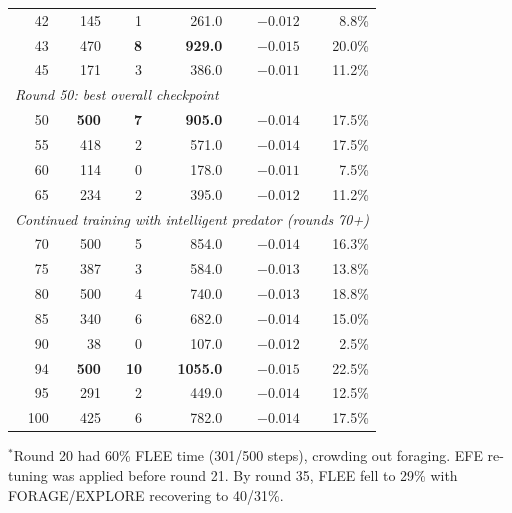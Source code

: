 \documentclass[12pt]{article}
\begin{document}
\begin{table}[H]
\begin{tabular}{rrrrrr}
42 & 145 & 1 & 261.0  & $-0.012$ & 8.8\% \\
43 & 470 & \textbf{8} & \textbf{929.0} & $-0.015$ & 20.0\% \\
45 & 171 & 3 & 386.0  & $-0.011$ & 11.2\% \\
\midrule
\multicolumn{6}{l}{\textit{Round 50: best overall checkpoint}} \\
\midrule
50 & \textbf{500} & \textbf{7} & \textbf{905.0} & $-0.014$ & 17.5\% \\
55 & 418 & 2 & 571.0  & $-0.014$ & 17.5\% \\
60 & 114 & 0 & 178.0  & $-0.011$ & 7.5\% \\
65 & 234 & 2 & 395.0  & $-0.012$ & 11.2\% \\
\midrule
\multicolumn{6}{l}{\textit{Continued training with intelligent predator (rounds 70+)}} \\
\midrule
70 & 500 & 5 & 854.0  & $-0.014$ & 16.3\% \\
75 & 387 & 3 & 584.0  & $-0.013$ & 13.8\% \\
80 & 500 & 4 & 740.0  & $-0.013$ & 18.8\% \\
85 & 340 & 6 & 682.0  & $-0.014$ & 15.0\% \\
90 & 38  & 0 & 107.0  & $-0.012$ & 2.5\% \\
94 & \textbf{500} & \textbf{10} & \textbf{1055.0} & $-0.015$ & 22.5\% \\
95 & 291 & 2 & 449.0  & $-0.014$ & 12.5\% \\
100 & 425 & 6 & 782.0  & $-0.014$ & 17.5\% \\
\bottomrule
\end{tabular}
\end{table}
\noindent $^*$Round 20 had 60\% FLEE time (301/500 steps), crowding out foraging.
EFE re-tuning was applied before round 21. By round 35, FLEE fell to 29\% with FORAGE/EXPLORE recovering to 40/31\%.
\end{document}
